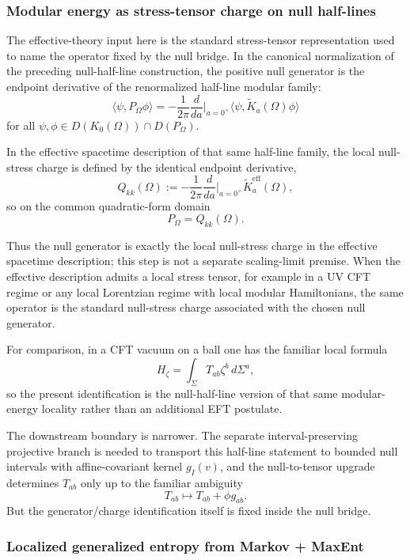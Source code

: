 \subsubsection{Modular energy as stress-tensor charge on null half-lines}\label{53-modular-energy-as-stress-tensor-charge-uv-cft}

The effective-theory input here is the standard stress-tensor representation used to name the operator fixed by the null bridge. In the canonical normalization of the preceding null-half-line construction, the positive null generator is the endpoint derivative of the renormalized half-line modular family:
\[
\langle\psi,P_\Omega\phi\rangle
=
-\frac{1}{2\pi}\frac{d}{da}\Big|_{a=0^+}
\langle\psi,\widetilde K_a(\Omega)\phi\rangle
\]
for all \(\psi,\phi\in D(K_0(\Omega))\cap D(P_\Omega)\).

In the effective spacetime description of that same half-line family, the local null-stress charge is defined by the identical endpoint derivative,
\[
Q_{kk}(\Omega)
:=
-\frac{1}{2\pi}\frac{d}{da}\Big|_{a=0^+}\widetilde K^{\mathrm{eff}}_a(\Omega),
\]
so on the common quadratic-form domain
\[
P_\Omega = Q_{kk}(\Omega).
\]

Thus the null generator is exactly the local null-stress charge in the effective spacetime description; this step is not a separate scaling-limit premise. When the effective description admits a local stress tensor, for example in a UV CFT regime or any local Lorentzian regime with local modular Hamiltonians, the same operator is the standard null-stress charge associated with the chosen null generator.

For comparison, in a CFT vacuum on a ball one has the familiar local formula
\[
H_{\zeta}=\int_{\Sigma}T_{ab}\zeta^b\,d\Sigma^a,
\]
so the present identification is the null-half-line version of that same modular-energy locality rather than an additional EFT postulate.

The downstream boundary is narrower. The separate interval-preserving projective branch is needed to transport this half-line statement to bounded null intervals with affine-covariant kernel \(g_I(v)\), and the null-to-tensor upgrade determines \(T_{ab}\) only up to the familiar ambiguity
\[
T_{ab}\mapsto T_{ab}+\phi g_{ab}.
\]
But the generator/charge identification itself is fixed inside the null bridge.

\subsubsection{Localized generalized entropy from Markov + MaxEnt}\label{54-localized-generalized-entropy-from-markov--maxent}

